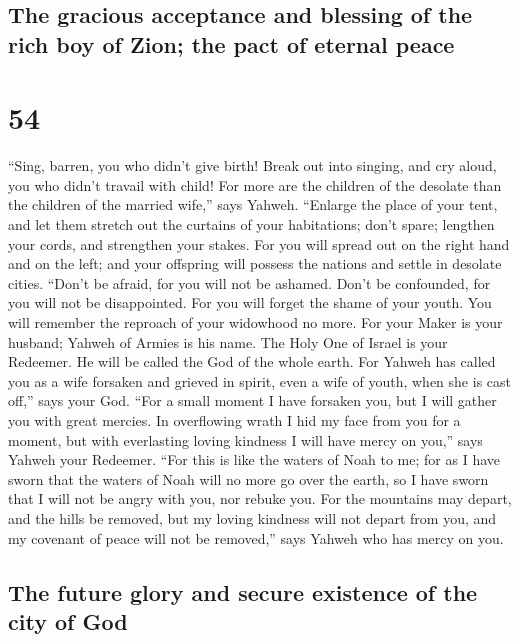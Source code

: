 \hypertarget{the-gracious-acceptance-and-blessing-of-the-rich-boy-of-zion-the-pact-of-eternal-peace}{%
\subsection{The gracious acceptance and blessing of the rich boy of
Zion; the pact of eternal
peace}\label{the-gracious-acceptance-and-blessing-of-the-rich-boy-of-zion-the-pact-of-eternal-peace}}

\hypertarget{section-53}{%
\section{54}\label{section-53}}

 ``Sing, barren, you who didn't give birth! Break out into
singing, and cry aloud, you who didn't travail with child! For more are
the children of the desolate than the children of the married wife,''
says Yahweh.  ``Enlarge the place of your tent, and let
them stretch out the curtains of your habitations; don't spare; lengthen
your cords, and strengthen your stakes.  For you will
spread out on the right hand and on the left; and your offspring will
possess the nations and settle in desolate cities. 
``Don't be afraid, for you will not be ashamed. Don't be confounded, for
you will not be disappointed. For you will forget the shame of your
youth. You will remember the reproach of your widowhood no more.
 For your Maker is your husband; Yahweh of Armies is his
name. The Holy One of Israel is your Redeemer. He will be called the God
of the whole earth.  For Yahweh has called you as a wife
forsaken and grieved in spirit, even a wife of youth, when she is cast
off,'' says your God.  ``For a small moment I have
forsaken you, but I will gather you with great mercies. 
In overflowing wrath I hid my face from you for a moment, but with
everlasting loving kindness I will have mercy on you,'' says Yahweh your
Redeemer.  ``For this is like the waters of Noah to me;
for as I have sworn that the waters of Noah will no more go over the
earth, so I have sworn that I will not be angry with you, nor rebuke
you.  For the mountains may depart, and the hills be
removed, but my loving kindness will not depart from you, and my
covenant of peace will not be removed,'' says Yahweh who has mercy on
you.

\hypertarget{the-future-glory-and-secure-existence-of-the-city-of-god}{%
\subsection{The future glory and secure existence of the city of
God}\label{the-future-glory-and-secure-existence-of-the-city-of-god}}

